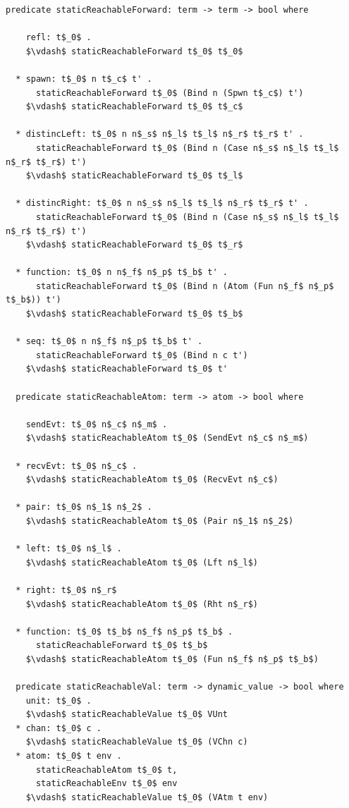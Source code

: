 \documentclass[letterpaper, 11pt]{report}
\begin{document}
\begin{lstlisting}[language=logic, mathescape]
  predicate staticReachableForward: term -> term -> bool where

    refl: t$_0$ .
    $\vdash$ staticReachableForward t$_0$ t$_0$

  * spawn: t$_0$ n t$_c$ t' .
      staticReachableForward t$_0$ (Bind n (Spwn t$_c$) t')
    $\vdash$ staticReachableForward t$_0$ t$_c$

  * distincLeft: t$_0$ n n$_s$ n$_l$ t$_l$ n$_r$ t$_r$ t' .
      staticReachableForward t$_0$ (Bind n (Case n$_s$ n$_l$ t$_l$ n$_r$ t$_r$) t')
    $\vdash$ staticReachableForward t$_0$ t$_l$

  * distincRight: t$_0$ n n$_s$ n$_l$ t$_l$ n$_r$ t$_r$ t' .
      staticReachableForward t$_0$ (Bind n (Case n$_s$ n$_l$ t$_l$ n$_r$ t$_r$) t')
    $\vdash$ staticReachableForward t$_0$ t$_r$

  * function: t$_0$ n n$_f$ n$_p$ t$_b$ t' .
      staticReachableForward t$_0$ (Bind n (Atom (Fun n$_f$ n$_p$ t$_b$)) t')
    $\vdash$ staticReachableForward t$_0$ t$_b$

  * seq: t$_0$ n n$_f$ n$_p$ t$_b$ t' .
      staticReachableForward t$_0$ (Bind n c t')
    $\vdash$ staticReachableForward t$_0$ t'

  predicate staticReachableAtom: term -> atom -> bool where

    sendEvt: t$_0$ n$_c$ n$_m$ .
    $\vdash$ staticReachableAtom t$_0$ (SendEvt n$_c$ n$_m$)

  * recvEvt: t$_0$ n$_c$ .
    $\vdash$ staticReachableAtom t$_0$ (RecvEvt n$_c$)

  * pair: t$_0$ n$_1$ n$_2$ .
    $\vdash$ staticReachableAtom t$_0$ (Pair n$_1$ n$_2$)

  * left: t$_0$ n$_l$ .
    $\vdash$ staticReachableAtom t$_0$ (Lft n$_l$)

  * right: t$_0$ n$_r$
    $\vdash$ staticReachableAtom t$_0$ (Rht n$_r$)

  * function: t$_0$ t$_b$ n$_f$ n$_p$ t$_b$ . 
      staticReachableForward t$_0$ t$_b$ 
    $\vdash$ staticReachableAtom t$_0$ (Fun n$_f$ n$_p$ t$_b$)

  predicate staticReachableVal: term -> dynamic_value -> bool where
    unit: t$_0$ .
    $\vdash$ staticReachableValue t$_0$ VUnt
  * chan: t$_0$ c .
    $\vdash$ staticReachableValue t$_0$ (VChn c)
  * atom: t$_0$ t env .
      staticReachableAtom t$_0$ t, 
      staticReachableEnv t$_0$ env
    $\vdash$ staticReachableValue t$_0$ (VAtm t env)


\end{lstlisting}
\end{document}
